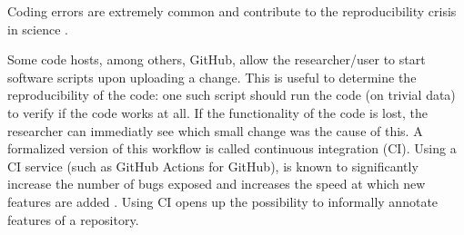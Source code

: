 
Coding errors are extremely common 
and contribute to the reproducibility crisis in science \cite{vable2021code}.



Some code hosts, among others, GitHub, 
allow the researcher/user to start software scripts upon uploading a change.
This is useful to determine the reproducibility of the code: 
one such script should run the code (on trivial data) 
to verify if the code works at all.
If the functionality of the code is lost, the researcher
can immediatly see which small change was the cause of this.
A formalized version of this workflow is called continuous integration (CI).
Using a CI service (such as GitHub Actions for GitHub), 
is known to significantly 
increase the number of bugs exposed \cite{vasilescu2015} and increases
the speed at which new features are added \cite{vasilescu2015}.
Using CI opens up the possibility to informally annotate features of
a repository. 

